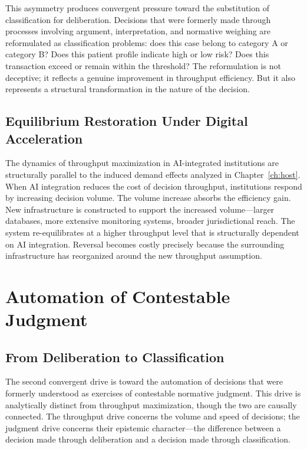 \documentclass[12pt, oneside]{book}
\theoremstyle{plain}
\theoremstyle{definition}
\theoremstyle{remark}
\theoremstyle{definition}
\begin{document}
This asymmetry produces convergent pressure toward the substitution of classification
for deliberation. Decisions that were formerly made through processes involving
argument, interpretation, and normative weighing are reformulated as classification
problems: does this case belong to category A or category B? Does this patient
profile indicate high or low risk? Does this transaction exceed or remain within
the threshold? The reformulation is not deceptive; it reflects a genuine improvement
in throughput efficiency. But it also represents a structural transformation in the
nature of the decision.

\section{Equilibrium Restoration Under Digital Acceleration}

The dynamics of throughput maximization in AI-integrated institutions are structurally
parallel to the induced demand effects analyzed in Chapter~\ref{ch:host}. When AI
integration reduces the cost of decision throughput, institutions respond by increasing
decision volume. The volume increase absorbs the efficiency gain. New infrastructure
is constructed to support the increased volume---larger databases, more extensive
monitoring systems, broader jurisdictional reach. The system re-equilibrates at a
higher throughput level that is structurally dependent on AI integration. Reversal
becomes costly precisely because the surrounding infrastructure has reorganized
around the new throughput assumption.

\chapter{Automation of Contestable Judgment}
\label{ch:judgment}

\section{From Deliberation to Classification}

The second convergent drive is toward the automation of decisions that were formerly
understood as exercises of contestable normative judgment. This drive is analytically
distinct from throughput maximization, though the two are causally connected. The
throughput drive concerns the volume and speed of decisions; the judgment drive
concerns their epistemic character---the difference between a decision made through
deliberation and a decision made through classification.
\end{document}
